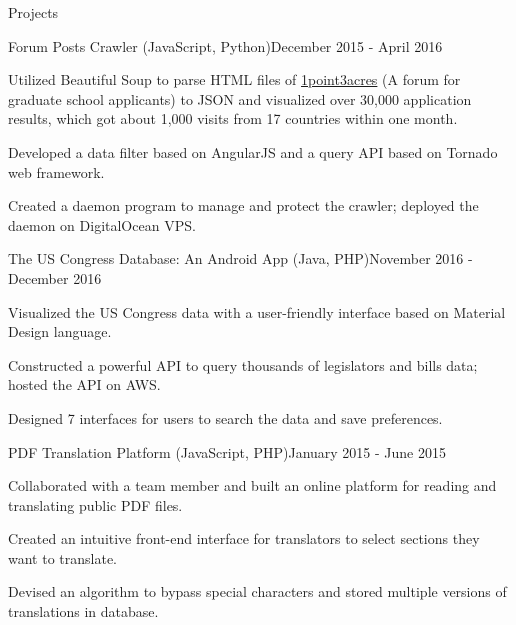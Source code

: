 \documentclass{resume} %
\begin{document}

\begin{rSection}{Projects}

\begin{rSubsection}{Forum Posts Crawler (JavaScript, Python)}{December 2015 - April 2016}{}{}
\item Utilized Beautiful Soup to parse HTML files of \href{http://1point3acres.com/bbs/forum.php}{1point3acres} (A forum for graduate school applicants) to JSON and visualized over 30,000 application results, which got about 1,000 visits from 17 countries within one month.
\item Developed a data filter based on AngularJS and a query API based on Tornado web framework.
\item Created a daemon program to manage and protect the crawler; deployed the daemon on DigitalOcean VPS.
\end{rSubsection}

\begin{rSubsection}{The US Congress Database: An Android App (Java, PHP)}{November 2016 - December 2016}{}{}
\item Visualized the US Congress data with a user-friendly interface based on Material Design language.
\item Constructed a powerful API to query thousands of legislators and bills data; hosted the API on AWS.
\item Designed 7 interfaces for users to search the data and save preferences.
\end{rSubsection}

%
\begin{rSubsection}{PDF Translation Platform (JavaScript, PHP)}{January 2015 - June 2015}{}{}
\item Collaborated with a team member and built an online platform for reading and translating public PDF files.
\item Created an intuitive front-end interface for translators to select sections they want to translate.
\item Devised an algorithm to bypass special characters and stored multiple versions of translations in database.
\end{rSubsection}


\end{rSection}
\end{document}
